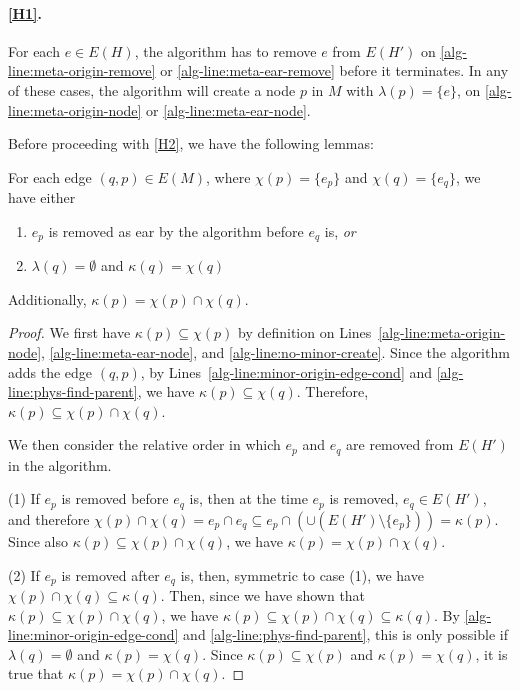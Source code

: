 \paragraph{\ref{H1}.} For each $e \in E(H)$, the algorithm has to remove $e$ from $E(H')$ on \cref{alg-line:meta-origin-remove} or \cref{alg-line:meta-ear-remove} before it terminates. In any of these cases, the algorithm will create a node $p$ in $M$ with $\lambda(p) = \{ e \}$, on \cref{alg-line:meta-origin-node} or \cref{alg-line:meta-ear-node}.

Before proceeding with \ref{H2}, we have the following lemmas:

\begin{lemma} \label{lem:meta-alg-edge-correct}
    For each edge $(q, p) \in E(M)$, where $\chi(p) = \{ e_p \}$ and $\chi(q) = \{ e_q \}$, we have either
    \begin{enumerate}
        \item $e_p$ is removed as ear by the algorithm before $e_q$ is, \emph{or}
        \item $\lambda(q) = \emptyset$ and $\kappa(q) = \chi(q)$
    \end{enumerate}
    Additionally, $\kappa(p) = \chi(p) \cap \chi(q)$.
\end{lemma}

\begin{proof}
    We first have $\kappa(p) \subseteq \chi(p)$ by definition on Lines~\ref{alg-line:meta-origin-node}, \ref{alg-line:meta-ear-node}, and \ref{alg-line:no-minor-create}.
    Since the algorithm adds the edge $(q, p)$, by Lines~\ref{alg-line:minor-origin-edge-cond} and \ref{alg-line:phys-find-parent}, we have $\kappa(p) \subseteq \chi(q)$.
    Therefore, $\kappa(p) \subseteq \chi(p) \cap \chi(q)$.
    
    We then consider the relative order in which $e_p$ and $e_q$ are removed from $E(H')$ in the algorithm.
    
    (1) If $e_p$ is removed before $e_q$ is, then at the time $e_p$ is removed, $e_q \in E(H')$, and therefore $\chi(p) \cap \chi(q) = e_p \cap e_q \subseteq e_p \cap (\cup (E(H') \setminus \{ e_p \})) = \kappa(p)$. Since also $\kappa(p) \subseteq \chi(p) \cap \chi(q)$, we have $\kappa(p) = \chi(p) \cap \chi(q)$.
    
    (2) If $e_p$ is removed after $e_q$ is, then, symmetric to case (1), we have $\chi(p) \cap \chi(q) \subseteq \kappa(q)$. Then, since we have shown that $\kappa(p) \subseteq \chi(p) \cap \chi(q)$, we have $\kappa(p) \subseteq \chi(p) \cap \chi(q) \subseteq \kappa(q)$.
    By \cref{alg-line:minor-origin-edge-cond} and \cref{alg-line:phys-find-parent}, this is only possible if $\lambda(q) = \emptyset$ and $\kappa(p) = \chi(q)$.
    Since $\kappa(p) \subseteq \chi(p)$ and $\kappa(p) = \chi(q)$, it is true that $\kappa(p) = \chi(p) \cap \chi(q)$.
\end{proof}

